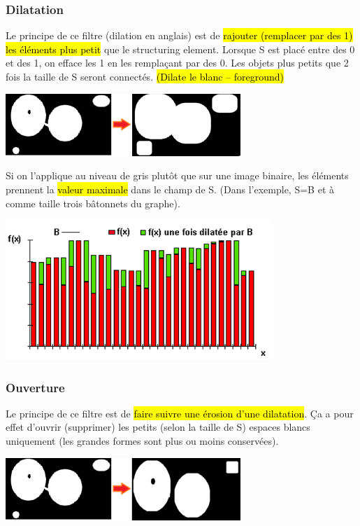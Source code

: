 \documentclass[letterpaper, 12pt]{article}
\newcommand{\alinea}{
\hspace*{0.5cm}}
\begin{document}
		\subsubsection{Dilatation}
			\alinea Le principe de ce filtre (dilation en anglais) est de \hl{rajouter (remplacer par des 1) les éléments plus petit} 
				que le structuring element.	Lorsque S est placé  entre des 0 et des 1, on efface les 1 en les remplaçant par des 0. 
				Les objets plus petits que 2 fois la taille de S seront connectés. \hl{(Dilate le blanc -- foreground)}
			\begin{center}
				\includegraphics[width=3.5in]{Images/dilation}
			\end{center}
			\begin{minipage}{0.33\textwidth}
				\alinea Si on l'applique au niveau de gris plutôt que sur une image binaire, les éléments prennent la \hl{valeur maximale}
					dans le champ de S. (Dans l'exemple, S=B et à comme taille trois bâtonnets du graphe).
			\end{minipage} \hfill
			\begin{minipage}{0.66\textwidth}
				\begin{center}
					\includegraphics[width=3.95in]{Images/dilation2}
				\end{center}
			\end{minipage}
		\subsubsection{Ouverture}
			\alinea Le principe de ce filtre est de \hl{faire suivre une érosion d'une dilatation}. Ça a pour effet d'ouvrir (supprimer) 
				les petits (selon la taille de S) espaces blancs uniquement (les grandes formes sont plus ou moins conservées).
			\begin{center}
				\includegraphics[width=3.5in]{Images/opening}
			\end{center}
\end{document}
